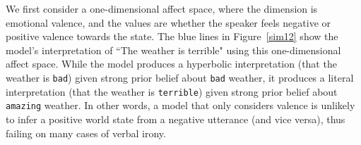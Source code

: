 \documentclass[10pt,letterpaper]{article}
\begin{document}
We first consider a one-dimensional affect space, where the dimension is emotional valence, and the values are whether the speaker feels negative or positive valence towards the state.  
%
%
The blue lines in Figure~\ref{sim12} show the model's interpretation of ``The weather is terrible" using this one-dimensional affect space. While the model produces a hyperbolic interpretation (that the weather is \texttt{bad}) given strong prior belief about \texttt{bad} weather, it produces a literal interpretation (that the weather is \texttt{terrible}) given strong prior belief about \texttt{amazing} weather. In other words, a model that only considers valence is unlikely to infer a positive world state from a negative utterance (and vice versa), thus failing on many cases of verbal irony. 
\end{document}
